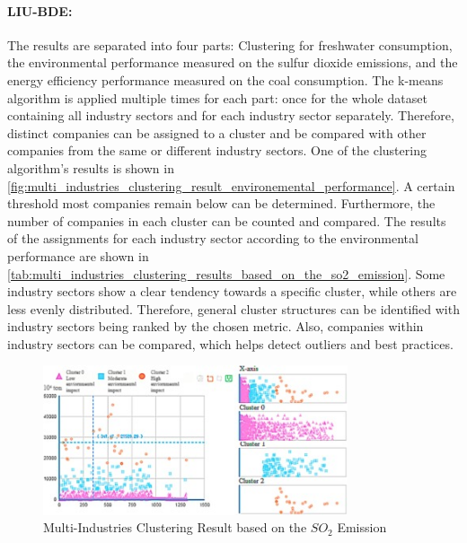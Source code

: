 \paragraph*{LIU-BDE:}
The results are separated into four parts: Clustering for freshwater consumption, the environmental performance measured on the sulfur dioxide emissions, and the energy efficiency performance measured on the coal consumption.
The k-means algorithm is applied multiple times for each part: once for the whole dataset containing all industry sectors and for each industry sector separately.
Therefore, distinct companies can be assigned to a cluster and be compared with other companies from the same or different industry sectors.
One of the clustering algorithm's results is shown in \autoref{fig:multi_industries_clustering_result_environemental_performance}.
A certain threshold most companies remain below can be determined.
Furthermore, the number of companies in each cluster can be counted and compared.
The results of the assignments for each industry sector according to the environmental performance are shown in \autoref{tab:multi_industries_clustering_results_based_on_the_so2_emission}.
Some industry sectors show a clear tendency towards a specific cluster, while others are less evenly distributed.
Therefore, general cluster structures can be identified with industry sectors being ranked by the chosen metric.
Also, companies within industry sectors can be compared, which helps detect outliers and best practices.

\begin{figure}
    \centering
    \includegraphics[width=0.8\textwidth]{figures/liu_assessmentOfIndustries/liu_environmentalPerformance.jpg}
    \caption{Multi-Industries Clustering Result based on the $SO_2$ Emission \cite{LIU-BDE}}
    \label{fig:multi_industries_clustering_result_environemental_performance}
\end{figure}

